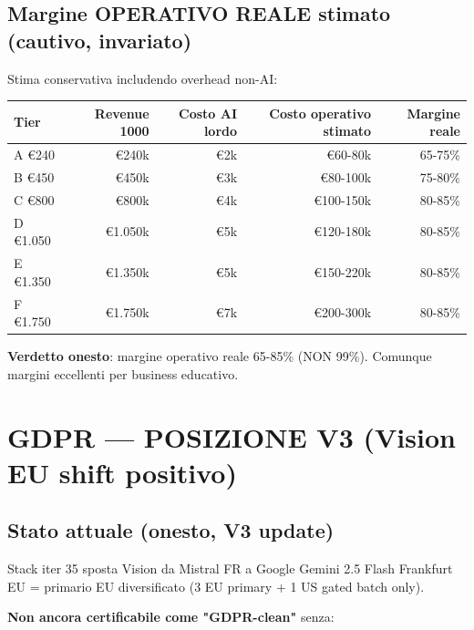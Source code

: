 \documentclass[12pt,a4paper]{article}
\begin{document}
\subsection*{Margine OPERATIVO REALE stimato (cautivo, invariato)}

Stima conservativa includendo overhead non-AI:

\begin{center}
\begin{tabular}{lrrrr}
\toprule
\textbf{Tier} & \textbf{Revenue 1000} & \textbf{Costo AI lordo} & \textbf{Costo operativo stimato} & \textbf{Margine reale} \\
\midrule
A €240   & €240k   & €2k & €60-80k  & ~65-75\% \\
B €450   & €450k   & €3k & €80-100k & ~75-80\% \\
C €800   & €800k   & €4k & €100-150k & ~80-85\% \\
D €1.050 & €1.050k & €5k & €120-180k & ~80-85\% \\
E €1.350 & €1.350k & €5k & €150-220k & ~80-85\% \\
F €1.750 & €1.750k & €7k & €200-300k & ~80-85\% \\
\bottomrule
\end{tabular}
\end{center}

\textbf{Verdetto onesto}: margine operativo reale 65-85\% (NON 99\%). Comunque margini eccellenti per business educativo.

\section{GDPR --- POSIZIONE V3 (Vision EU shift positivo)}

\subsection*{Stato attuale (onesto, V3 update)}

Stack iter 35 sposta Vision da Mistral FR a Google Gemini 2.5 Flash Frankfurt EU = primario EU diversificato (3 EU primary + 1 US gated batch only).

\textbf{Non ancora certificabile come "GDPR-clean"} senza:
\end{document}
